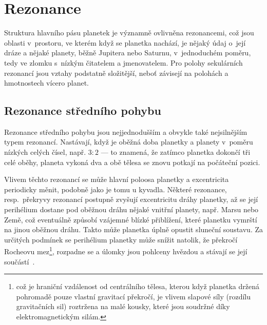 \documentclass[A4paper, 12pt, oneside]{book}
\begin{document}
\pagebreak
\section{Rezonance}
Struktura hlavního pásu planetek je významně ovlivněna rezonancemi, což jsou oblasti v~prostoru, ve kterém když se planetka nachází, je nějaký údaj o~její dráze a nějaké planety, běžně Jupitera nebo Saturnu, v~jednoduchém poměru, tedy ve zlomku s~nízkým čitatelem a jmenovatelem. Pro polohy sekulárních rezonancí jsou vztahy podstatně složitější, neboť závisejí na polohách a hmotnostech vícero planet.
\subsection{Rezonance středního pohybu} \label{sec:meanmotion}

Rezonance středního pohybu jsou nejjednodušším a obvykle také nejsilnějším typem rezonancí. Nastávají, když je oběžná doba planetky a planety v~poměru nízkých celých čísel, např. $3:2$ --- to znamená, že zatímco planetka dokončí tři celé oběhy, planeta vykoná dva a obě tělesa se znovu potkají na počáteční pozici. 

Vlivem těchto rezonancí se může hlavní poloosa planetky a excentricita periodicky měnit, podobně jako je tomu u kyvadla. Některé rezonance, resp.\ překryvy rezonancí postupně zvyšují excentricitu dráhy planetky, až se její perihélium dostane pod oběžnou dráhu nějaké vnitřní planety, např. Marsu nebo Země, což eventuálně způsobí vzájemné blízké přiblížení, které planetku vymrští na jinou oběžnou dráhu. Takto může planetka úplně opustit sluneční soustavu. Za určitých podmínek se perihélium planetky může snížit natolik, že překročí Rocheovu mez\footnote{což je hraniční vzdálenost od centrálního tělesa, kterou když planetka držená pohromadě pouze vlastní gravitací překročí, je vlivem slapové síly (rozdílu gravitačních sil) roztržena na malé kousky, které jsou soudržné díky elektromagnetickým silám.}, rozpadne se a úlomky jsou pohlceny hvězdou a stávají se její součástí~\cite{pichierri17}.
\end{document}
